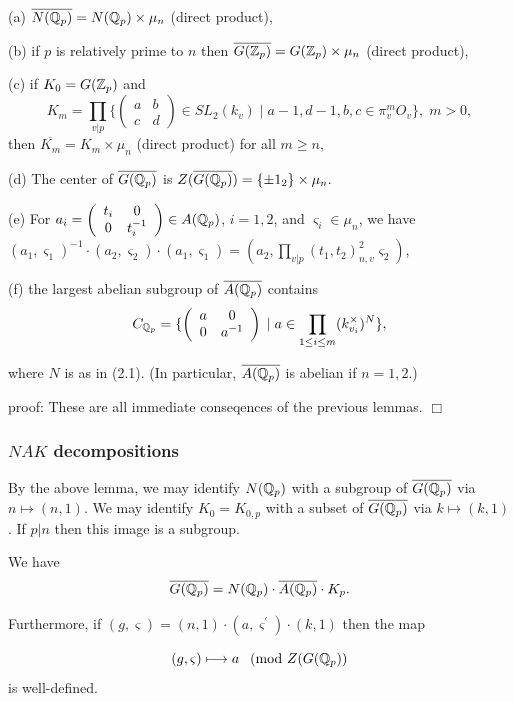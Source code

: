 \begin{lemma}
(a) $\overline{N({\Bbb Q}_p)}=N({\Bbb Q}_p)\times \mu _n$ (direct product),

(b) if $p$ is relatively prime to $n$ then $\overline{G({\Bbb Z}_p)}=G({\Bbb %
Z}_p)\times \mu _n$ (direct product),

(c) if $K_0=G({\Bbb Z}_p)$ and 
\[
K_m=\prod_{v|p}\{\left( 
\begin{array}{cc}
a & b \\ 
c & d
\end{array}
\right) \in SL_2(k_v)\;|\;a-1,d-1,b,c\in \pi _v^mO_v\},\;m>0,
\]
then $\overline{K_m}=K_m\times \mu _n$ (direct product) for all $m\geq n$,

(d) The center of $\overline{G({\Bbb Q}_p)}$ is $Z(\overline{G({\Bbb Q}_p)}%
)=\{\pm 1_2\}\times \mu _n.$

(e) For $a_i=\left( 
\begin{array}{cc}
t_i & 0 \\ 
0 & t_i^{-1}
\end{array}
\right) \in A({\Bbb Q}_p)$, $i=1,2$, and $\varsigma _i\in \mu _n$, we have $%
(a_1,\varsigma _1)^{-1}\cdot (a_2,\varsigma _2)\cdot (a_1,\varsigma
_1)=(a_2,\prod_{v|p}(t_1,t_2)_{n,v}^2\varsigma _2)$,

(f) the largest abelian subgroup of $\overline{A({\Bbb Q}_p)}$ contains 
\[
C_{{\Bbb Q}_p}=\{\left( 
\begin{array}{cc}
a & 0 \\ 
0 & a^{-1}
\end{array}
\right) \;|\;a\in \prod_{1\leq i\leq m}(k_{v_i}^{\times })^N\},
\]

where $N$ is as in (2.1). (In particular, $\overline{A({\Bbb Q}_p)}$ is
abelian if $n=1,2$.)
\end{lemma}

proof: These are all immediate conseqences of the previous lemmas. $\Box $

\subsubsection{$NAK$ decompositions}

By the above lemma, we may identify $N({\Bbb Q}_p)$ with a subgroup of $%
\overline{G({\Bbb Q}_p)}$ via $n\longmapsto (n,1)$. We may identify $%
K_0=K_{0,p}$ with a subset of $\overline{G({\Bbb Q}_p)}$ via $k\longmapsto
(k,1)$. If $p|n$ then this image is a subgroup.

\begin{lemma}
We have 
\[
\overline{G({\Bbb Q}_p)}=N({\Bbb Q}_p)\cdot \overline{A({\Bbb Q}_p)}\cdot
K_p.
\]

Furthermore, if $(g,\varsigma )=(n,1)\cdot (a,\varsigma ^{\prime })\cdot
(k,1)$ then the map

\[
(g,\varsigma )\longmapsto a\ \pmod{Z(G({\Bbb Q}_p)}
\]
is well-defined.
\end{lemma}

